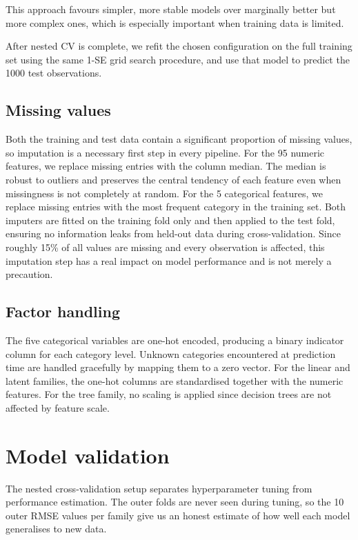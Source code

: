 \documentclass{article}
\begin{document}
This approach favours simpler, more stable models over marginally better but more complex ones, which is especially important when training data is limited.

After nested CV is complete, we refit the chosen configuration on the full training set using the same 1-SE grid search procedure, and use that model to predict the 1000 test observations.

\subsection*{Missing values}

Both the training and test data contain a significant proportion of missing values, so imputation is a necessary first step in every pipeline. For the 95 numeric features, we replace missing entries with the column median. The median is robust to outliers and preserves the central tendency of each feature even when missingness is not completely at random. For the 5 categorical features, we replace missing entries with the most frequent category in the training set. Both imputers are fitted on the training fold only and then applied to the test fold, ensuring no information leaks from held-out data during cross-validation. Since roughly 15\% of all values are missing and every observation is affected, this imputation step has a real impact on model performance and is not merely a precaution.

\subsection*{Factor handling}

The five categorical variables are one-hot encoded, producing a binary indicator column for each category level. Unknown categories encountered at prediction time are handled gracefully by mapping them to a zero vector. For the linear and latent families, the one-hot columns are standardised together with the numeric features. For the tree family, no scaling is applied since decision trees are not affected by feature scale.

\section*{Model validation}

The nested cross-validation setup separates hyperparameter tuning from performance estimation. The outer folds are never seen during tuning, so the 10 outer RMSE values per family give us an honest estimate of how well each model generalises to new data.
\end{document}
